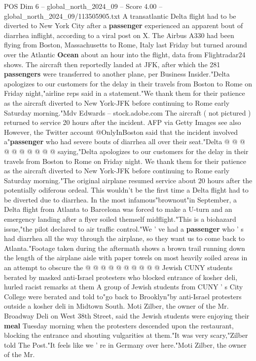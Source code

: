 \begin{textsample}{POS Dim 6 – global\_north\_2024\_09 – Score 4.00 – global\_north\_2024\_09/113505905.txt}  \label{ex:f6_pos_430}
A transatlantic Delta flight had to be diverted to New York City after a \textbf{passenger} experienced an apparent bout of diarrhea inflight, according to a viral post on X.
The Airbus A330 had been flying from Boston, Massachusetts to Rome, Italy last Friday but turned around over the Atlantic \textbf{Ocean} about an hour into the flight, data from Flightradar24 shows.
The aircraft then reportedly landed at JFK, after which the 281 \textbf{passengers} were transferred to another plane, per Business Insider."Delta apologizes to our customers for the delay in their travels from Boston to Rome on Friday night,"airline reps said in a statement."We thank them for their patience as the aircraft diverted to New York-JFK before continuing to Rome early Saturday morning."Mdv Edwards -- stock.adobe.com The aircraft ( not pictured ) returned to service 20 hours after the incident.
AFP via Getty Images see also However, the Twitter account @OnlyInBoston said that the incident involved a"\textbf{passenger} who had severe bouts of diarrhea all over their seat."Delta @ @ @ @ @ @ @ @ @ @ saying,"Delta apologizes to our customers for the delay in their travels from Boston to Rome on Friday night.
We thank them for their patience as the aircraft diverted to New York-JFK before continuing to Rome early Saturday morning."The original airplane resumed service about 20 hours after the potentially odiferous ordeal.
This wouldn't be the first time a Delta flight had to be diverted due to diarrhea.
In the most infamous"brownout"in September, a Delta flight from Atlanta to Barcelona was forced to make a U-turn and an emergency landing after a flyer soiled themself midflight."This is a biohazard issue,"the pilot declared to air traffic control."We ' ve had a \textbf{passenger} who ' s had diarrhea all the way through the airplane, so they want us to come back to Atlanta."Footage taken during the aftermath shows a brown trail running down the length of the airplane aisle with paper towels on most heavily soiled areas in an attempt to obscure the @ @ @ @ @ @ @ @ @ @ Jewish CUNY students berated by masked anti-Israel protesters who blocked entrance of kosher deli, hurled racist remarks at them A group of Jewish students from CUNY ' s City College were berated and told to"go back to Brooklyn"by anti-Israel protesters outside a kosher deli in Midtown South.
Moti Zilber, the owner of the Mr.
Broadway Deli on West 38th Street, said the Jewish students were enjoying their \textbf{meal} Tuesday morning when the protesters descended upon the restaurant, blocking the entrance and shouting vulgarities at them."It was very scary,"Zilber told The Post."It feels like we ' re in Germany over here."Moti Zilber, the owner of the Mr.

\end{textsample}
